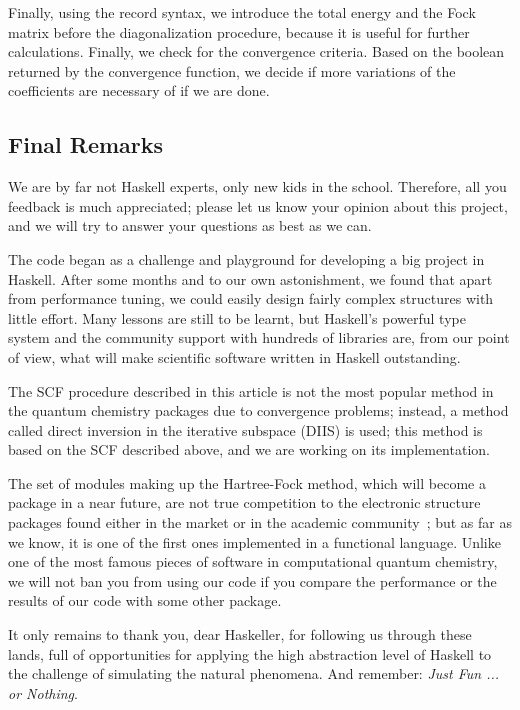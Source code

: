 \documentclass{tmr}
\begin{document}
Finally, using the record syntax, we introduce the
total energy and the Fock matrix before the diagonalization procedure,
because it is useful for further calculations. Finally, we 
check for the convergence criteria. Based
on the boolean returned by the convergence function, we decide if more
variations of the coefficients are necessary of if we are done.

\subsection{Final Remarks}

We are by far not Haskell experts, only new kids in the school. Therefore, all
you feedback is much appreciated; please let us know your opinion about
this project, and we will try to answer your questions as best as we can.

The code began as a challenge and playground for developing a big project 
in Haskell. After some months and to our own astonishment, we found that
apart from performance tuning, we could
easily design fairly complex structures with little effort. Many lessons 
are still to be learnt, but Haskell's powerful type system and the
community support with hundreds of libraries are, from our point of view, what will make 
scientific software written in Haskell outstanding.

The SCF procedure described in this article is not the most popular method in
the quantum chemistry packages due to convergence problems; instead, a
method called direct inversion in the iterative subspace (DIIS) is used; this method is
based on the SCF described above, and we are working on its implementation.

The set of modules making up the Hartree-Fock method, which will 
become a package in a near future, are not true competition
to the electronic structure packages found either in the market
or in the academic community~\cite{software};
but as far as we know, it is one of the first ones implemented in a 
functional language. Unlike one of the
most famous pieces of software in computational quantum chemistry, we
will not ban you from using our code if you
compare the performance or the results of our code with some
other package.~\cite{banned}

It only remains to thank you, dear Haskeller, for following us through these
lands, full of opportunities for applying the high abstraction level
of Haskell to the challenge of simulating the natural phenomena. And
remember: \textit{Just Fun ... or Nothing}.
\end{document}
